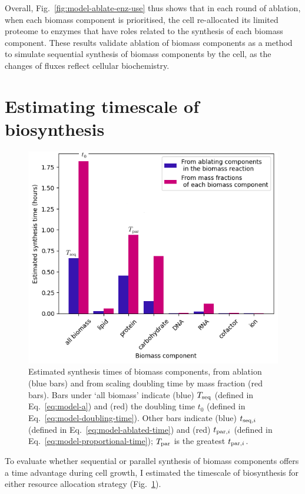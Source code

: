 Overall, Fig.\ \ref{fig:model-ablate-enz-use} thus shows that in each round of ablation, when each biomass component is prioritised, the cell re-allocated its limited proteome to enzymes that have roles related to the synthesis of each biomass component.
These results validate ablation of biomass components as a method to simulate sequential synthesis of biomass components by the cell, as the changes of fluxes reflect cellular biochemistry.


\section{Estimating timescale of biosynthesis}
\label{sec:model-timescale}

\begin{figure}
  \centering
  \includegraphics[width=.7\linewidth]{ablation_example_adapted.png}
  \caption[
    Estimated synthesis times of biomass components, from ablation and from scaling doubling time by mass fraction.
  ]{
    Estimated synthesis times of biomass components, from ablation (blue bars) and from scaling doubling time by mass fraction (red bars).
    Bars under `all biomass' indicate (blue) $T_{\mathrm{seq}}$ (defined in Eq.\ \ref{eq:model-a}) and (red) the doubling time $t_{0}$ (defined in Eq.\ \ref{eq:model-doubling-time}).
    Other bars indicate (blue) $t_{\mathrm{seq},i}$ (defined in Eq.\ \ref{eq:model-ablated-time}) and (red) $t_{\mathrm{par},i}$ (defined in Eq.\ \ref{eq:model-proportional-time}); $T_{\mathrm{par}}$ is the greatest $t_{\mathrm{par},i}$.
  }
  \label{fig:model-ablate-times}
\end{figure}


To evaluate whether sequential or parallel synthesis of biomass components offers a time advantage during cell growth, I estimated the timescale of biosynthesis for either resource allocation strategy (Fig.\ \ref{fig:model-ablate-times}).

